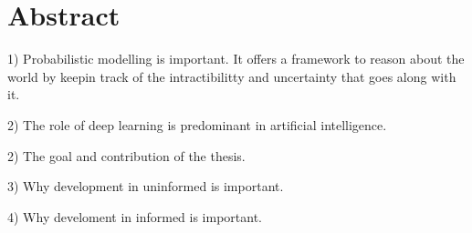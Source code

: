 
\chapter*{Abstract}
1) Probabilistic modelling is important. It offers a framework to reason about the world by keepin track of the intractibilitty and uncertainty that  goes along with it.

2) The role of deep learning is predominant in artificial intelligence.

2) The goal and contribution of the thesis.

3) Why development in uninformed is important.

4) Why develoment in informed is important.
